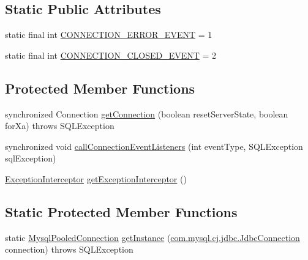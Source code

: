\subsection*{Static Public Attributes}
\begin{DoxyCompactItemize}
\item 
static final int \mbox{\hyperlink{classcom_1_1mysql_1_1cj_1_1jdbc_1_1_mysql_pooled_connection_ab6f2b2f8756ecc1ae0672be11de86066}{C\+O\+N\+N\+E\+C\+T\+I\+O\+N\+\_\+\+E\+R\+R\+O\+R\+\_\+\+E\+V\+E\+NT}} = 1
\item 
static final int \mbox{\hyperlink{classcom_1_1mysql_1_1cj_1_1jdbc_1_1_mysql_pooled_connection_a0d53e8b5f1ba1fb67bf1f46adfd2dd3f}{C\+O\+N\+N\+E\+C\+T\+I\+O\+N\+\_\+\+C\+L\+O\+S\+E\+D\+\_\+\+E\+V\+E\+NT}} = 2
\end{DoxyCompactItemize}
\subsection*{Protected Member Functions}
\begin{DoxyCompactItemize}
\item 
synchronized Connection \mbox{\hyperlink{classcom_1_1mysql_1_1cj_1_1jdbc_1_1_mysql_pooled_connection_af11a94c2e295f24a352a705b8cec6318}{get\+Connection}} (boolean reset\+Server\+State, boolean for\+Xa)  throws S\+Q\+L\+Exception 
\item 
synchronized void \mbox{\hyperlink{classcom_1_1mysql_1_1cj_1_1jdbc_1_1_mysql_pooled_connection_a6b4c7d8f141c670b4fd01246fb88d45b}{call\+Connection\+Event\+Listeners}} (int event\+Type, S\+Q\+L\+Exception sql\+Exception)
\item 
\mbox{\hyperlink{interfacecom_1_1mysql_1_1cj_1_1exceptions_1_1_exception_interceptor}{Exception\+Interceptor}} \mbox{\hyperlink{classcom_1_1mysql_1_1cj_1_1jdbc_1_1_mysql_pooled_connection_a900b07bbc0861fcdc04ef70092ce2ee0}{get\+Exception\+Interceptor}} ()
\end{DoxyCompactItemize}
\subsection*{Static Protected Member Functions}
\begin{DoxyCompactItemize}
\item 
static \mbox{\hyperlink{classcom_1_1mysql_1_1cj_1_1jdbc_1_1_mysql_pooled_connection}{Mysql\+Pooled\+Connection}} \mbox{\hyperlink{classcom_1_1mysql_1_1cj_1_1jdbc_1_1_mysql_pooled_connection_a032132b2437e23862f9d1f8d2c0788c0}{get\+Instance}} (\mbox{\hyperlink{interfacecom_1_1mysql_1_1cj_1_1jdbc_1_1_jdbc_connection}{com.\+mysql.\+cj.\+jdbc.\+Jdbc\+Connection}} connection)  throws S\+Q\+L\+Exception 
\end{DoxyCompactItemize}


